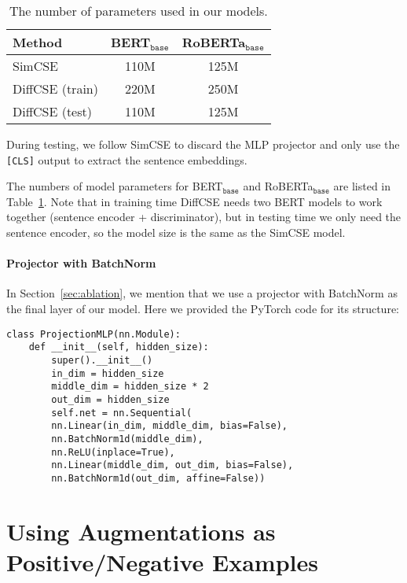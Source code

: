 \documentclass[11pt]{article}
\newcommand{\ba}{$_\texttt{base}$\xspace}
\begin{document}
\begin{table}[h!]
\centering
\small
\setlength\tabcolsep{3pt}
\begin{tabular}{lcc}
\toprule
\bf Method & \bf BERT\ba & \bf RoBERTa\ba\\
\midrule
SimCSE & 110M & 125M\\
DiffCSE (train) & 220M & 250M\\
DiffCSE (test) & 110M & 125M\\
\bottomrule
\end{tabular}
\caption{The number of parameters used in our models.}
\label{tab:nparam}
\end{table}

During testing, we follow SimCSE to discard the MLP projector and only use the \texttt{[CLS]} output to extract the sentence embeddings.

The numbers of model parameters for BERT\ba and RoBERTa\ba are listed in Table~\ref{tab:nparam}. Note that in training time DiffCSE needs two BERT models to work together (sentence encoder + discriminator), but in testing time we only need the sentence encoder, so the model size is the same as the SimCSE model.


\paragraph{Projector with BatchNorm}
In Section~\ref{sec:ablation}, we mention that we use a projector with BatchNorm as the final layer of our model. Here we provided the PyTorch code for its structure:
\begin{lstlisting}
class ProjectionMLP(nn.Module):
    def __init__(self, hidden_size): 
        super().__init__()
        in_dim = hidden_size
        middle_dim = hidden_size * 2
        out_dim = hidden_size
        self.net = nn.Sequential(
        nn.Linear(in_dim, middle_dim, bias=False),
        nn.BatchNorm1d(middle_dim),
        nn.ReLU(inplace=True),
        nn.Linear(middle_dim, out_dim, bias=False),
        nn.BatchNorm1d(out_dim, affine=False))
\end{lstlisting}

\section{Using Augmentations as Positive/Negative Examples}
\end{document}
